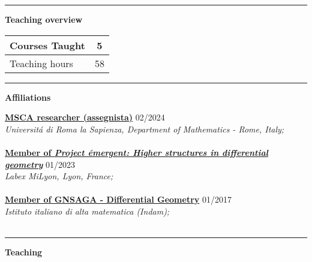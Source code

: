 \documentclass[a4paper]{article}
\newcommand{\block}[1]{\hrule \vspace{0.2cm} \textbf{\Large #1} \vspace{0.2cm}}
\newcommand{\voice}[5]{\href{#4}{\textbf{#1}} \hfill #2 \\ \textit{#3} \\ {\small #5} \vspace{0.2cm} \\}
\begin{document}


    \block{Teaching overview} 
    
    \begin{tabularx}{\linewidth}{|X|c|}
    \hline
    
    Courses Taught & 5 \\
    \hline
    
    Teaching hours & 58 \\
    \hline
    
    \end{tabularx}
    \vspace{1em}




    \block{Affiliations}

    
    \voice{MSCA researcher (assegnista)}
        {02/2024}
        {Universit\'a di Roma la Sapienza, Department of Mathematics - Rome, Italy;}
        {https://www.mat.uniroma1.it/persone/miti}       
        {\vspace{-0.5cm}}
    \voice{Member of \emph{Project \'emergent: Higher structures in differential geometry}}
        {01/2023}
        {Labex MiLyon, Lyon, France;}
        {https://www.dropbox.com/s/36kh0vre45r38b2/2301-MiLyon-HigherGeometry.pdf?dl=0}       
        {\vspace{-0.5cm}}
    \voice{Member of GNSAGA - Differential Geometry}
        {01/2017}
        {Istituto italiano di alta matematica (Indam);}
        {https://web.archive.org/web/20170924125645/http://www.altamatematica.it/gnsaga/node/23}       
        {\vspace{-0.5cm}}





    \block{Teaching}
\end{document}
